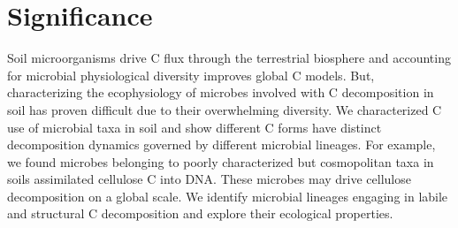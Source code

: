 \section{Significance} Soil microorganisms drive C flux through the terrestrial
biosphere and accounting for microbial physiological diversity improves global
C models. But, characterizing the ecophysiology of microbes involved with
C decomposition in soil has proven difficult due to their overwhelming
diversity. We characterized C use of microbial taxa in soil and show different
C forms have distinct decomposition dynamics governed by different microbial
lineages. For example, we found microbes belonging to poorly characterized but
cosmopolitan taxa in soils assimilated cellulose C into DNA. These microbes may
drive cellulose decomposition on a global scale. We identify microbial lineages
engaging in labile and structural C decomposition and explore their ecological
properties.
